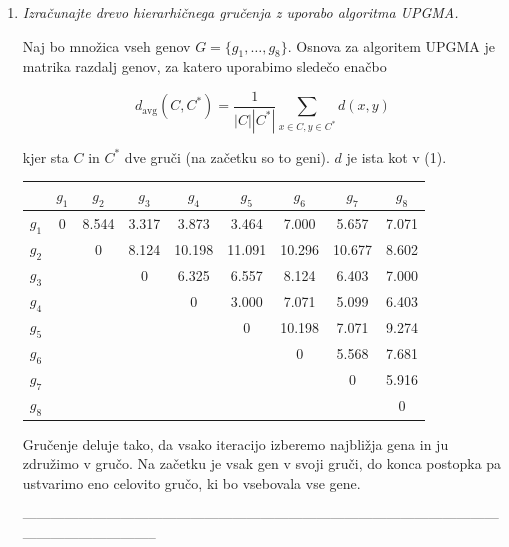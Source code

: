 \documentclass{article}
\begin{document}
\begin{enumerate}
		\newpage

	\item \textit{Izračunajte drevo hierarhičnega gručenja z uporabo algoritma UPGMA.}

		Naj bo množica vseh genov $G = \{g_1, \dots, g_8 \}$.
		Osnova za algoritem UPGMA je matrika razdalj genov, za katero uporabimo sledečo enačbo

		\begin{equation}
			d_{\text{avg}}(C, C^*) = \frac{ 1 }{ |C| |C^*| } \sum_{x\in C, y\in C^*} d(x,y)
		\end{equation}

		kjer sta $C$ in $C^*$ dve gruči (na začetku so to geni). $d$ je ista kot v (1).

		\begin{center}
			\begin{tabular}{c||c|c|c|c|c|c|c|c|}
				& $g_1$ & $g_2$ & $g_3$ & $g_4$ & $g_5$ & $g_6$ & $g_7$ & $g_8$ \\
				\hline
				\hline
				$g_1$ & 0     & 8.544 & 3.317 & 3.873 & 3.464 & 7.000 & 5.657 & 7.071 \\
				\hline
				$g_2$ &       & 0     & 8.124 & 10.198 & 11.091 & 10.296 & 10.677 & 8.602 \\
				\hline
				$g_3$ &       &       & 0     & 6.325 & 6.557  & 8.124  & 6.403 & 7.000 \\
				\hline
				$g_4$ &       &       &       & 0     & 3.000  & 7.071  & 5.099 & 6.403 \\
				\hline
				$g_5$ &       &       &       &       & 0      & 10.198 & 7.071 & 9.274 \\
				\hline
				$g_6$ &       &       &       &       &        & 0      & 5.568 & 7.681 \\
				\hline
				$g_7$ &       &       &       &       &        &        & 0     & 5.916 \\
				\hline
				$g_8$ &       &       &       &       &        &        &        & 0     \\
			\end{tabular}
		\end{center}

		Gručenje deluje tako, da vsako iteracijo izberemo najbližja gena in ju združimo
		v gručo. Na začetku je vsak gen v svoji gruči, do konca postopka pa ustvarimo eno
		celovito gručo, ki bo vsebovala vse gene.

		-----------------------------------------------------------------------------------------------------------------------------------


\end{enumerate}
\end{document}
